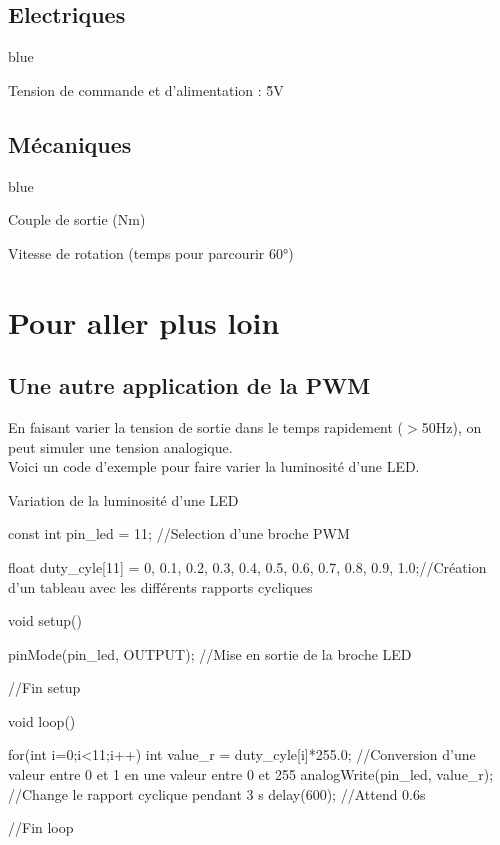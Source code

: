 \subsection{Electriques}


\begin{items}{blue}{\Bullet}
  \item Tension de commande et d'alimentation : \~5V
\end{items}

\subsection{Mécaniques}

\begin{items}{blue}{\Bullet}
  \item Couple de sortie (Nm)
  \item Vitesse de rotation (temps pour parcourir 60°)
\end{items}




\section{Pour aller plus loin}

\subsection{Une autre application de la PWM}

En faisant varier la tension de sortie dans le temps rapidement ($>$50Hz), on peut simuler une 
tension analogique.\\

Voici un code d'exemple pour faire varier la luminosité d'une LED.

\begin{Cpp}{Variation de la luminosité d'une LED}

  const int pin_led = 11; //Selection d'une broche PWM

  float duty_cyle[11] = {0, 0.1, 0.2, 0.3, 0.4, 0.5, 0.6, 0.7, 0.8, 0.9, 1.0};//Création d'un tableau avec les différents 
  rapports cycliques
  
  void setup() {
  
      pinMode(pin_led, OUTPUT);  //Mise en sortie de la broche LED
  
  }//Fin setup
  
  void loop() {
  
      for(int i=0;i<11;i++) 
      {
          int value_r = duty_cyle[i]*255.0; //Conversion d'une valeur entre 0 et 1 en une valeur entre 0 et 255
          analogWrite(pin_led, value_r); //Change le rapport cyclique pendant 3 s
          delay(600);        //Attend 0.6s
      }
      
  
  }//Fin loop

\end{Cpp}


